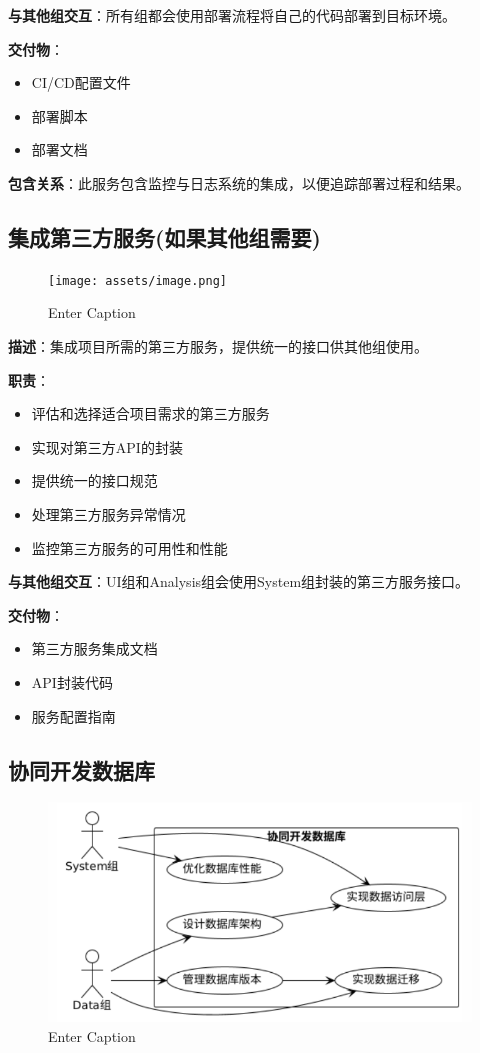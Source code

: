\documentclass[a4paper,12pt]{article}
\begin{document}
\textbf{与其他组交互}：所有组都会使用部署流程将自己的代码部署到目标环境。

\textbf{交付物}：
\begin{itemize}
  \item CI/CD配置文件
  \item 部署脚本
  \item 部署文档
\end{itemize}

\textbf{包含关系}：此服务包含监控与日志系统的集成，以便追踪部署过程和结果。

\subsection{集成第三方服务(如果其他组需要)}

\begin{figure}[H]
    \centering
    \texttt{[image: assets/image.png]}
    \caption{Enter Caption}
    \label{fig:enter-label}
\end{figure}

\textbf{描述}：集成项目所需的第三方服务，提供统一的接口供其他组使用。

\textbf{职责}：
\begin{itemize}
  \item 评估和选择适合项目需求的第三方服务
  \item 实现对第三方API的封装
  \item 提供统一的接口规范
  \item 处理第三方服务异常情况
  \item 监控第三方服务的可用性和性能
\end{itemize}

\textbf{与其他组交互}：UI组和Analysis组会使用System组封装的第三方服务接口。

\textbf{交付物}：
\begin{itemize}
  \item 第三方服务集成文档
  \item API封装代码
  \item 服务配置指南
\end{itemize}

\subsection{协同开发数据库}

\begin{figure}
    \centering
    \includegraphics[width=0.75\linewidth]{assets/image8.png}
    \caption{Enter Caption}
    \label{fig:enter-label}
\end{figure}
\end{document}
